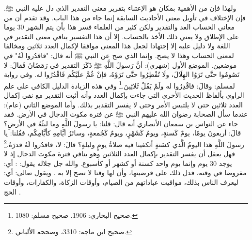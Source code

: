 ولهذا فإن من الأهمية بمكان هو الإعتناء بتقرير معنى التقدير الذي دل عليه النبي ﷺ. فإن الإختلاف في تأويل معنى الأحاديث السابقة إنما جاء من هذا الباب. وقد تقدم أن من معاني الحساب العد والتقدير ولكن كثير من العلماء فسر هذا بأن يتم الشهر 30 يوما على الإطلاق ولا يعني ذلك الأخذ بالحساب. إلا أن هذا التفسير ينافي معنى التقدير في اللغة ولا دليل عليه إلا إجتهادا لجعل هذا المعنى موافقا لإكمال العدد ثلاثين ومخالفا لمعنى الحساب وهذا لا يصح. وإنما الذي صح عن النبي ﷺ أنه قال: "فاقدُروا لَهُ" في موضعين. الموضع الأول (شهري): أنَّ رَسولَ اللَّهِ ﷺ ذَكَرَ التقدير في رَمَضَانَ فَقالَ: لا تَصُومُوا حتَّى تَرَوُا الهِلَالَ، ولَا تُفْطِرُوا حتَّى تَرَوْهُ، فإنْ غُمَّ علَيْكُم فَاقْدُرُوا له. وفي رواية لمسلم: وقالَ: فاقْدِرُوا له ولَمْ يَقُلْ ثَلاثِينَ.\footnote{صحيح البخاري: 1906. صحيح مسلم: 1080.} وفي هذه الزيادة الدليل الكافي على علم الراوي بألفاظ الحديث الأخرى التي جاءت بإكمال العدد وأنه أثبت التقدير مع نفي إكمال العدد ثلاثين حتى لا يلتبس الأمر وحتى لا يفسر التقدير بذلك. وأما الموضع الثاني (عام): عندما سأل الصحابة رضوان الله عليهم النبي ﷺ عن فترة مكوث الدجال في الأرض. فقد جاء عن النواس بن سمعان الأنصاري أنه قال: قلنا: يا رسولَ اللَّهِ وما لبثُهُ في الأرضِ؟ قالَ: أربعونَ يومًا، يومٌ كَسنةٍ، ويومٌ كَشَهْرٍ، ويومٌ كَجُمعةٍ، وسائرُ أيَّامِهِ كأيَّامِكُم، فقُلنا: يا رسولَ اللَّهِ هذا اليومُ الَّذي كسَنةٍ أتكفينا فيه صلاةُ يومٍ وليلةٍ؟ قالَ: لا، فاقدُروا لَهُ قدرَهُ.\footnote{صحيح ابن ماجه: 3310، وصححه الألباني.} فهل يعقل أن يفسر التقدير بإكمال العدد الثلاثين وهو ينافي فترة مكوث الدجال إذ لا يوجد 30 يوم وإنما يوم واحد كسنة أو كشهر أو كأسبوع. والله جل جلاله يقول: \quranayah*[4][103][14] {\footnotesize (\surahname*[4])}:  أي: مفروضا في وقته، فدل ذلك على فرضيتها، وأن لها وقتا لا تصح إلا به \cite{tafsir_Saadi}. ويقول تعالى: \quranayah*[2][189][1-8] {\footnotesize (\surahname*[2])} أي: ليعرف الناس بذلك، مواقيت عباداتهم من الصيام، وأوقات الزكاة، والكفارات، وأوقات الحج \cite{tafsir_Saadi}.

